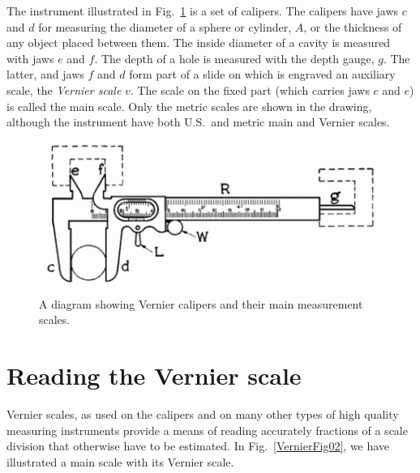 

The instrument illustrated in Fig.~\ref{VernierFig01} is a set of calipers.  The calipers have jaws $c$ and $d$ for measuring the diameter of a sphere or cylinder, $A$, or the thickness of any object placed between them. The inside diameter of a cavity is measured with jaws $e$ and $f$.  The depth of a hole is measured with the depth gauge, $g$.  The latter, and jaws $f$ and $d$ form part of a slide on which is engraved an auxiliary scale, the \textsl{Vernier scale} $v$. The scale on the fixed part (which carries jaws $c$ and $e$) is called the main scale. Only the metric scales are shown in the drawing, although the instrument have both U.S.\ and metric main and Vernier scales.

\begin{figure}
  \begin{center}
    \includegraphics[width=5in]{IntroductionFigures/VernierCalipers01.pdf}
  \end{center}
  \caption{A diagram showing Vernier calipers and their main measurement scales.}
  \label{VernierFig01}  %
\end{figure}

\section{Reading the Vernier scale}

Vernier scales, as used on the calipers and on many other types of high quality measuring instruments provide a means of reading accurately fractions of a scale division that otherwise have to be estimated.  In Fig.~\ref{VernierFig02}, we have illustrated a main scale with its Vernier scale.

